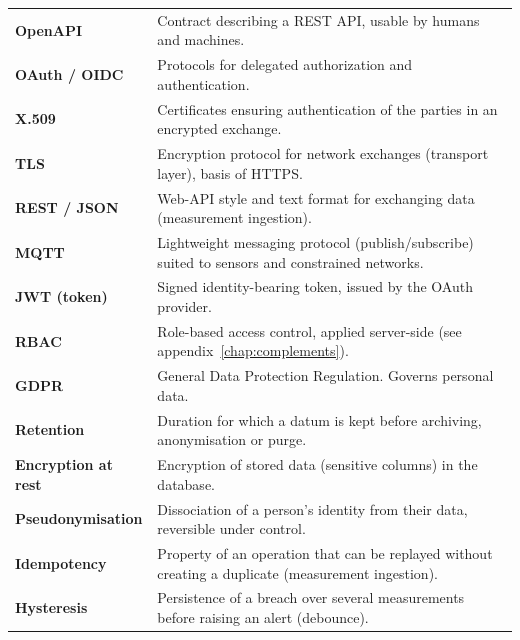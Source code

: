 \begin{xltabular}{\textwidth}{>{\bfseries}p{4cm} X}
OpenAPI & Contract describing a REST API, usable by humans and machines. \\
OAuth / OIDC & Protocols for delegated authorization and authentication. \\
X.509 & Certificates ensuring authentication of the parties in an encrypted exchange. \\
TLS & Encryption protocol for network exchanges (transport layer), basis of HTTPS. \\
REST / JSON & Web-API style and text format for exchanging data (measurement ingestion). \\
MQTT & Lightweight messaging protocol (publish/subscribe) suited to sensors and constrained networks. \\
JWT (token) & Signed identity-bearing token, issued by the OAuth provider. \\
RBAC & Role-based access control, applied server-side (see appendix~\ref{chap:complements}). \\
GDPR & General Data Protection Regulation. Governs personal data. \\
Retention & Duration for which a datum is kept before archiving, anonymisation or purge. \\
Encryption at rest & Encryption of stored data (sensitive columns) in the database. \\
Pseudonymisation & Dissociation of a person's identity from their data, reversible under control. \\
Idempotency & Property of an operation that can be replayed without creating a duplicate (measurement ingestion). \\
Hysteresis & Persistence of a breach over several measurements before raising an alert (debounce). \\
\bottomrule
\end{xltabular}
